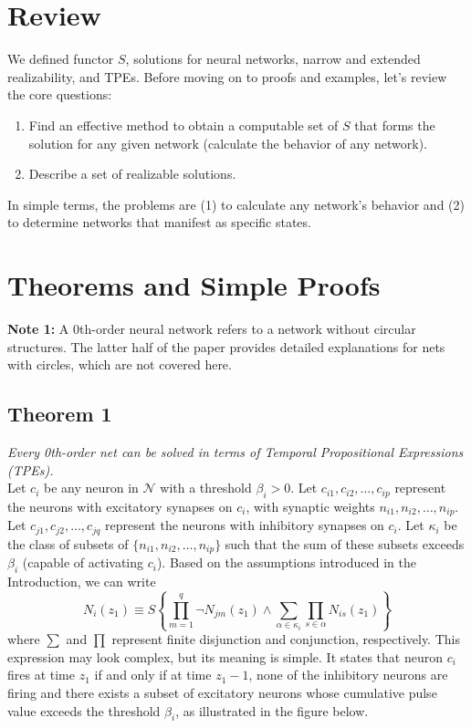 \documentclass[11p,oneside]{book}
\begin{document}
\section*{Review}

We defined functor $S$, solutions for neural networks, narrow and extended realizability, and TPEs. Before moving on to proofs and examples, let’s review the core questions:
\begin{enumerate}
    \item Find an effective method to obtain a computable set of $S$ that forms the solution for any given network (calculate the behavior of any network).
    \item Describe a set of realizable solutions.
\end{enumerate}

In simple terms, the problems are (1) to calculate any network's behavior and (2) to determine networks that manifest as specific states.

\section*{Theorems and Simple Proofs}

\textbf{Note 1:} A 0th-order neural network refers to a network without circular structures. The latter half of the paper provides detailed explanations for nets with circles, which are not covered here.

\subsection*{Theorem 1}
\textit{Every 0th-order net can be solved in terms of Temporal Propositional Expressions (TPEs).}
\\

Let $c_i$ be any neuron in $\mathcal{N}$ with a threshold $\beta_i > 0$. Let $c_{i1}, c_{i2}, \ldots, c_{ip}$ represent the neurons with excitatory synapses on $c_i$, with synaptic weights $n_{i1}, n_{i2}, \ldots, n_{ip}$. Let $c_{j1}, c_{j2}, \ldots, c_{jq}$ represent the neurons with inhibitory synapses on $c_i$. Let $\kappa_i$ be the class of subsets of $\{n_{i1}, n_{i2}, \ldots, n_{ip}\}$ such that the sum of these subsets exceeds $\beta_i$ (capable of activating $c_i$). Based on the assumptions introduced in the Introduction, we can write
\[
N_i(z_1) \equiv S \left\{\prod_{m=1}^q \lnot N_{jm}(z_1) \land \sum_{\alpha \in \kappa_i} \prod_{s \in \alpha} N_{is}(z_1) \right\}
\]
where $\sum$ and $\prod$ represent finite disjunction and conjunction, respectively. This expression may look complex, but its meaning is simple. It states that neuron $c_i$ fires at time $z_1$ if and only if at time $z_1 - 1$, none of the inhibitory neurons are firing and there exists a subset of excitatory neurons whose cumulative pulse value exceeds the threshold $\beta_i$, as illustrated in the figure below.
\end{document}
